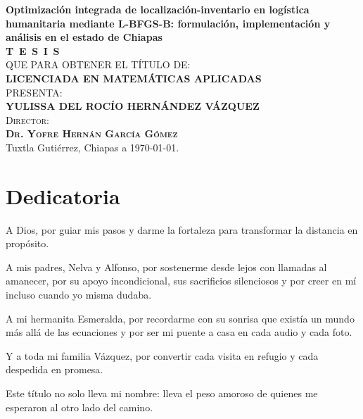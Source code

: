\documentclass[
  spanish,
  us-letterpaper,
]{scrreprt}
\numberwithin{equation}{section}
\begin{document}
\begin{titlepage}
\begin{minipage}[t][0.95\textheight][c]{0.76\textwidth}
            \begin{center}
                {\Large\bfseries Optimización integrada de localización-inventario en logística humanitaria mediante L-BFGS-B: formulación, implementación y análisis en el estado de Chiapas}\\[2cm]
                \textsc{\huge \textbf{T\, E\, S\, I\, S}}\\[1.5cm]
                \textsc{\large QUE PARA OBTENER EL TÍTULO DE:}\\[0.3cm]
                \textbf{\textsc{LICENCIADA EN MATEMÁTICAS APLICADAS}}\\[1.5cm]
                \textsc{\large PRESENTA:}\\[0.3cm]
                \textbf{\textsc{\large {YULISSA DEL ROCÍO HERNÁNDEZ VÁZQUEZ}}}\\[2cm]
                {\large\scshape Director:\\[0.3cm]
                {\textbf{\large Dr. Yofre Hernán García Gómez }}}\\[2.0cm]
                \large{Tuxtla Gutiérrez, Chiapas a \today.}

            \end{center}
\end{minipage}
\end{titlepage}

\pagebreak[2]

\chapter*{Dedicatoria}
\begin{center}
\itshape
\setlength{\parindent}{0pt} %
\setlength{\parskip}{1.2\baselineskip} %

A Dios, por guiar mis pasos y darme la fortaleza para transformar la distancia en propósito.

A mis padres, Nelva y Alfonso, por sostenerme desde lejos con llamadas al amanecer, por su apoyo incondicional, sus sacrificios silenciosos y por creer en mí incluso cuando yo misma dudaba.

A mi hermanita Esmeralda, por recordarme con su sonrisa que existía un mundo más allá de las ecuaciones y por ser mi puente a casa en cada audio y cada foto.

Y a toda mi familia Vázquez, por convertir cada visita en refugio y cada despedida en promesa.

Este título no solo lleva mi nombre: lleva el peso amoroso de quienes me esperaron al otro lado del camino.
\end{center}
\end{document}
